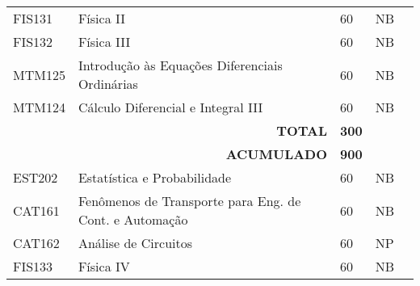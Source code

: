 \begin{table}[]
{\begin{tabular}{l|l|l|l|l}
			\multicolumn{1}{|l|}{FIS131}                        & Física II                                                & 60                                                           & NB                      &  \\ \cline{1-4}
			\multicolumn{1}{|l|}{FIS132}                        & Física III                                               & 60                                                           & NB                      &  \\ \cline{1-4}
			\multicolumn{1}{|l|}{MTM125}                        & Introdução às Equações Diferenciais Ordinárias           & 60                                                           & NB                      &  \\ \cline{1-4}
			\multicolumn{1}{|l|}{MTM124}                        & Cálculo Diferencial e Integral III                       & 60                                                           & NB                      &  \\ \cline{1-4}
			\multicolumn{1}{|l|}{}                              & \multicolumn{1}{r|}{\textbf{TOTAL}}                      & \textbf{300}                                                 &                         &  \\ \cline{1-4}
			\multicolumn{1}{|l|}{}                              & \multicolumn{1}{r|}{\textbf{ACUMULADO}}                  & \textbf{900}                                                 &                         &  \\ \cline{1-4}
			\multicolumn{1}{|l|}{EST202}                        & Estatística e Probabilidade                              & 60                                                           & NB                      &  \\ \cline{1-4}
			\multicolumn{1}{|l|}{CAT161}                        & Fenômenos de Transporte para Eng. de Cont. e Automação   & 60                                                           & NB                      &  \\ \cline{1-4}
			\multicolumn{1}{|l|}{CAT162}                        & Análise de Circuitos                                     & 60                                                           & NP                      &  \\ \cline{1-4}
			\multicolumn{1}{|l|}{FIS133}                        & Física IV                                                & 60                                                           & NB                      &  \\ \cline{1-4}

\end{tabular}}
\end{table}
